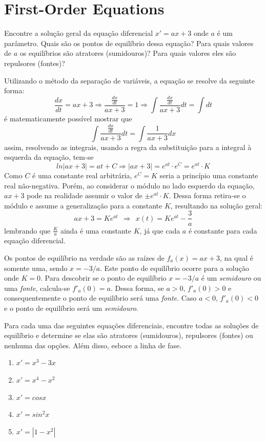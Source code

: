 \chapter{First-Order Equations}

\begin{exercicio}
	Encontre a solução geral da equação diferencial $x'=ax+3$ onde $a$ é um parâmetro. Quais são os pontos de equilíbrio dessa equação? Para quais valores de $a$ os equilíbrios são atratores (sumidouros)? Para quais valores eles são repulsores (fontes)?
\end{exercicio}

\begin{solucao}
Utilizando o método da separação de variáveis, a equação se resolve da seguinte forma: $$\frac{dx}{dt}=ax+3 \Rightarrow \frac{\frac{dx}{dt}}{ax+3}=1 \Rightarrow \int{\frac{\frac{dx}{dt}}{ax+3}}dt=\int dt$$
é matematicamente possível mostrar que $$\int{\frac{\frac{dx}{dt}}{ax+3}}dt = \int{\frac{1}{ax+3}}dx$$
assim, resolvendo as integrais, usando a regra da substituição para a integral à esquerda da equação, tem-se $$ln|ax+3|=at+C \Rightarrow |ax+3| = e^{at}\cdot e^C = e^{at} \cdot K$$
Como $C$ é uma constante real arbitrária, $e^C = K$ seria a princípio uma constante real não-negativa. Porém, ao considerar o módulo no lado esquerdo da equação, $ax+3$ pode na realidade assumir o valor de $\pm e^{at}\cdot K$. Dessa forma retira-se o módulo e assume a generalização para a constante $K$, resultando na solução geral: $$ax+3 = Ke^{at} ~~\Rightarrow~~ x(t) = Ke^{at} - \frac{3}{a}$$
lembrando que $\frac{K}{a}$ ainda é uma constante $K$, já que cada $a$ é constante para cada equação diferencial. \par

Os pontos de equilíbrio na verdade são as raízes de $f_a(x) = ax+3$, na qual é somente uma, sendo $x=-3/a$. Este ponto de equilíbrio ocorre para a solução onde $K=0$. Para descobrir se o ponto de equilíbrio $x=-3/a$ é um \textit{semidouro} ou uma \textit{fonte}, calcula-se $f'_a(0) = a$. Dessa forma, se $a>0$, $f'_a(0)>0$ e consequentemente o ponto de equilíbrio será uma \textit{fonte}. Caso $a<0$, $f'_a(0)<0$ e o ponto de equilíbrio será um \textit{semidouro}.

\end{solucao}

\begin{exercicio}
Para cada uma das seguintes equações diferenciais, encontre todas as soluções de equilíbrio e determine se elas são atratores (sumidouros), repulsores (fontes) ou nenhuma das opções. Além disso, esboce a linha de fase.

\begin{enumerate}[label=(\alph{*})]
		\item $x'=x^3-3x$
		\item $x'=x^4-x^2$
		\item $x'=cosx$
		\item $x'=sin^2x$
		\item $x'=|1-x^2|$
	\end{enumerate}
\end{exercicio}

